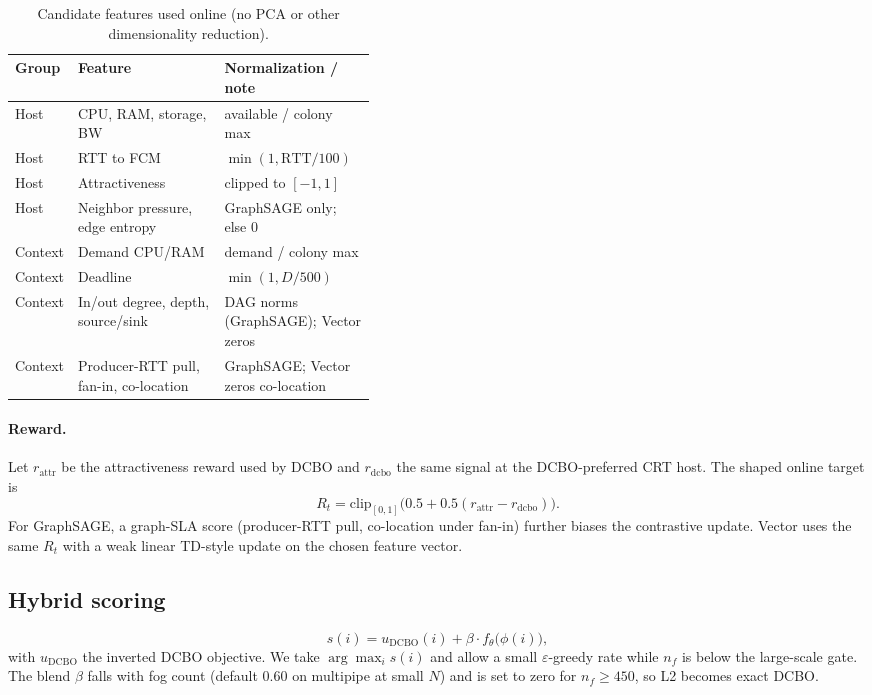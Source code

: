 \documentclass[pdflatex,sn-mathphys-num,iicol]{sn-jnl}
\begin{document}
\begin{table}[htbp]
\centering
\caption{Candidate features used online (no PCA or other dimensionality reduction).}
\label{tab:features}
\small
\begin{tabular}{@{}llp{0.42\linewidth}@{}}
\toprule
Group & Feature & Normalization / note \\
\midrule
Host & CPU, RAM, storage, BW & available / colony max \\
Host & RTT to FCM & $\min(1,\mathrm{RTT}/100)$ \\
Host & Attractiveness & clipped to $[-1,1]$ \\
Host & Neighbor pressure, edge entropy & GraphSAGE only; else $0$ \\
Context & Demand CPU/RAM & demand / colony max \\
Context & Deadline & $\min(1,D/500)$ \\
Context & In/out degree, depth, source/sink & DAG norms (GraphSAGE); Vector zeros \\
Context & Producer-RTT pull, fan-in, co-location & GraphSAGE; Vector zeros co-location \\
\bottomrule
\end{tabular}
\end{table}

\paragraph{Reward.}
Let $r_{\mathrm{attr}}$ be the attractiveness reward used by DCBO and
$r_{\mathrm{dcbo}}$ the same signal at the DCBO-preferred CRT host. The shaped
online target is
\begin{equation}
R_t=\mathrm{clip}_{[0,1]}\bigl(0.5+0.5(r_{\mathrm{attr}}-r_{\mathrm{dcbo}})\bigr).
\end{equation}
For GraphSAGE, a graph-SLA score (producer-RTT pull, co-location under fan-in) further
biases the contrastive update. Vector uses the same $R_t$ with a weak linear
TD-style update on the chosen feature vector.

\subsection{Hybrid scoring}
\begin{equation}
s(i)=u_{\mathrm{DCBO}}(i)+\beta\cdot f_\theta\bigl(\phi(i)\bigr),
\label{eq:hybrid}
\end{equation}
with $u_{\mathrm{DCBO}}$ the inverted DCBO objective. We take $\arg\max_i s(i)$
and allow a small $\varepsilon$-greedy rate while $n_f$ is below the large-scale
gate. The blend $\beta$ falls with fog count (default $0.60$ on multipipe at
small $N$) and is set to zero for $n_f\ge 450$, so L2 becomes exact DCBO.
\end{document}
